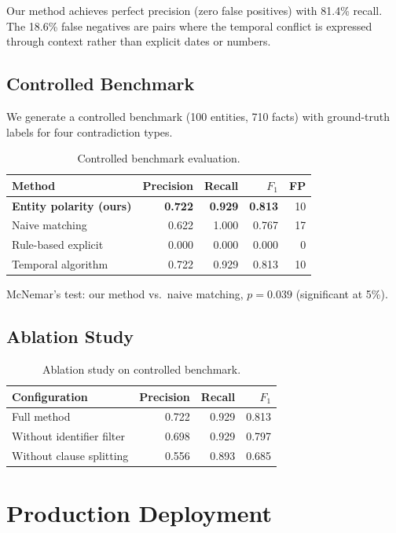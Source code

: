 \documentclass{article}
\begin{document}
Our method achieves perfect precision (zero false positives) with 81.4\% recall. The 18.6\% false negatives are pairs where the temporal conflict is expressed through context rather than explicit dates or numbers.

\subsection{Controlled Benchmark}

We generate a controlled benchmark (100 entities, 710 facts) with ground-truth labels for four contradiction types.

\begin{table}[h]
\centering
\caption{Controlled benchmark evaluation.}
\begin{tabular}{lrrrr}
\toprule
Method & Precision & Recall & $F_1$ & FP \\
\midrule
\textbf{Entity polarity (ours)} & \textbf{0.722} & \textbf{0.929} & \textbf{0.813} & 10 \\
Naive matching & 0.622 & 1.000 & 0.767 & 17 \\
Rule-based explicit & 0.000 & 0.000 & 0.000 & 0 \\
Temporal algorithm & 0.722 & 0.929 & 0.813 & 10 \\
\bottomrule
\end{tabular}
\label{tab:controlled}
\end{table}

McNemar's test: our method vs.\ naive matching, $p = 0.039$ (significant at 5\%).

\subsection{Ablation Study}

\begin{table}[h]
\centering
\caption{Ablation study on controlled benchmark.}
\begin{tabular}{lrrr}
\toprule
Configuration & Precision & Recall & $F_1$ \\
\midrule
Full method & 0.722 & 0.929 & 0.813 \\
Without identifier filter & 0.698 & 0.929 & 0.797 \\
Without clause splitting & 0.556 & 0.893 & 0.685 \\
\bottomrule
\end{tabular}
\label{tab:ablation}
\end{table}

\section{Production Deployment}
\label{sec:production}
\end{document}
